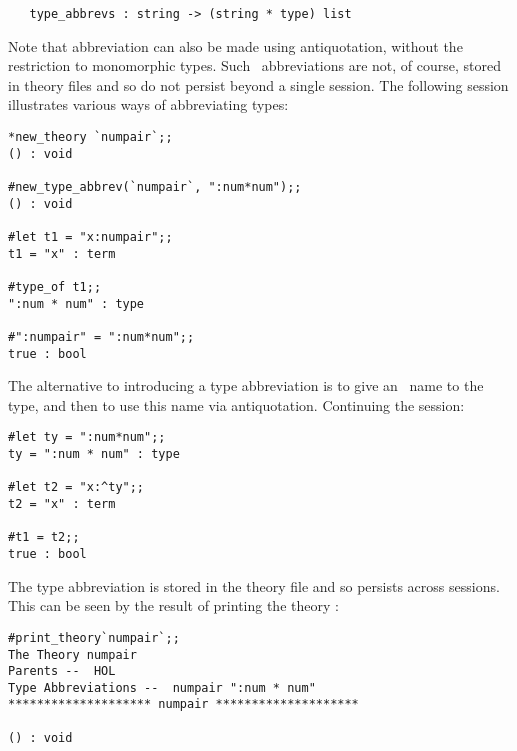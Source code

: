 \begin{boxed}
\begin{verbatim}
   type_abbrevs : string -> (string * type) list
\end{verbatim}\end{boxed}


Note that abbreviation can also be made using antiquotation, without the
restriction to monomorphic types. Such \ML\ abbreviations are not, of course,
stored in theory files and so do not persist beyond a single session.
The following session illustrates various ways of
abbreviating types:

\setcounter{sessioncount}{1}
\begin{session}\begin{verbatim}
*new_theory `numpair`;;
() : void

#new_type_abbrev(`numpair`, ":num*num");;
() : void

#let t1 = "x:numpair";;
t1 = "x" : term

#type_of t1;;
":num * num" : type

#":numpair" = ":num*num";;
true : bool
\end{verbatim}\end{session}

\noindent The alternative to introducing a type abbreviation is
to give an \ML\ name to the type, and then to use this name via antiquotation.
Continuing the session:

\begin{session}\begin{verbatim}
#let ty = ":num*num";;
ty = ":num * num" : type

#let t2 = "x:^ty";;
t2 = "x" : term

#t1 = t2;;
true : bool
\end{verbatim}\end{session}

\pagebreak[2]

\noindent The type abbreviation is stored in the theory file and so
persists across sessions. This can be seen by the result of printing
the theory :

\begin{session}\begin{verbatim}
#print_theory`numpair`;;
The Theory numpair
Parents --  HOL
Type Abbreviations --  numpair ":num * num"
******************** numpair ********************

() : void
\end{verbatim}\end{session}

